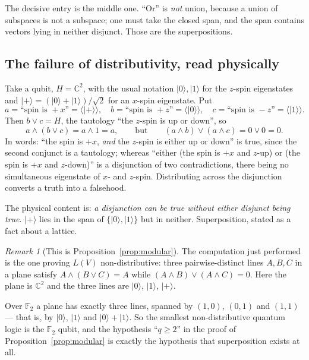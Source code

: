 \documentclass[11pt,a4paper]{article}
\theoremstyle{definition}
\theoremstyle{remark}
\newtheorem{remark}[theorem]{Remark}
\newcommand{\FF}{\mathbb{F}}
\newcommand{\CC}{\mathbb{C}}
\begin{document}
The decisive entry is the middle one. ``Or'' is \emph{not} union, because a union of subspaces
is not a subspace; one must take the closed span, and the span contains vectors lying in
neither disjunct. Those are the superpositions.

\subsection{The failure of distributivity, read physically}

Take a qubit, $H = \CC^{2}$, with the usual notation $\lvert 0\rangle, \lvert 1\rangle$ for
the $z$-spin eigenstates and $\lvert +\rangle = (\lvert 0\rangle + \lvert 1\rangle)/\sqrt{2}$
for an $x$-spin eigenstate. Put
\[
  a = \text{``spin is } {+}x\text{''} = \langle \lvert +\rangle\rangle, \quad
  b = \text{``spin is } {+}z\text{''} = \langle \lvert 0\rangle\rangle, \quad
  c = \text{``spin is } {-}z\text{''} = \langle \lvert 1\rangle\rangle .
\]
Then $b \vee c = H$, the tautology ``the $z$-spin is up or down'', so
\[
  a \wedge (b \vee c) = a \wedge 1 = a,
  \qquad\text{but}\qquad
  (a \wedge b) \vee (a \wedge c) = 0 \vee 0 = 0 .
\]
In words: ``the spin is $+x$, \emph{and} the $z$-spin is either up or down'' is true, since
the second conjunct is a tautology; whereas ``either (the spin is $+x$ and $z$-up) or (the
spin is $+x$ and $z$-down)'' is a disjunction of two contradictions, there being no
simultaneous eigenstate of $x$- and $z$-spin. Distributing across the disjunction converts a
truth into a falsehood.

The physical content is: \emph{a disjunction can be true without either disjunct being true}.
$\lvert +\rangle$ lies in the span of $\{\lvert 0\rangle, \lvert 1\rangle\}$ but in neither.
Superposition, stated as a fact about a lattice.

\begin{remark}[This is Proposition~\ref{prop:modular}]\label{rem:samecomputation}
The computation just performed is the one proving $L(V)$ non-distributive: three
pairwise-distinct lines $A, B, C$ in a plane satisfy $A \wedge (B \vee C) = A$ while
$(A \wedge B) \vee (A \wedge C) = 0$. Here the plane is $\CC^{2}$ and the three lines are
$\lvert 0\rangle$, $\lvert 1\rangle$, $\lvert +\rangle$.

Over $\FF_2$ a plane has exactly three lines, spanned by $(1,0)$, $(0,1)$ and $(1,1)$ ---
that is, by $\lvert 0\rangle$, $\lvert 1\rangle$ and $\lvert 0\rangle + \lvert 1\rangle$. So
the smallest non-distributive quantum logic is the $\FF_2$ qubit, and the hypothesis
``$q \geq 2$'' in the proof of Proposition~\ref{prop:modular} is exactly the hypothesis that
superposition exists at all.
\end{remark}
\end{document}
